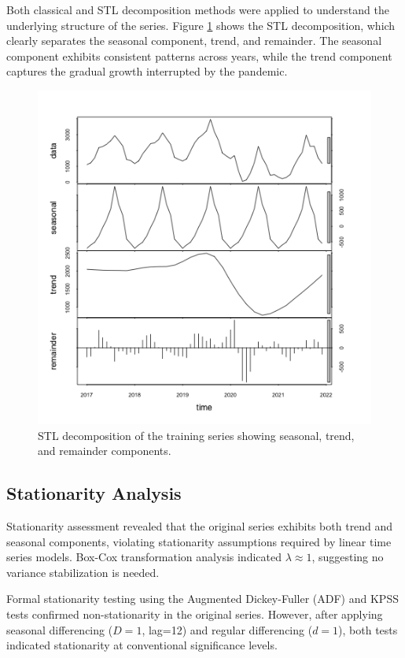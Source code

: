 \documentclass[journal]{IEEEtran}
\begin{document}
Both classical and STL decomposition methods were applied to understand the underlying structure of the series. Figure \ref{fig:decomposition} shows the STL decomposition, which clearly separates the seasonal component, trend, and remainder. The seasonal component exhibits consistent patterns across years, while the trend component captures the gradual growth interrupted by the pandemic.

\begin{figure}[h]
    \centering
    \includegraphics[width=1\linewidth]{plots/decomposition-stl.png}
    \caption{STL decomposition of the training series showing seasonal, trend, and remainder components.}
    \label{fig:decomposition}
\end{figure}

\subsection{Stationarity Analysis}

Stationarity assessment revealed that the original series exhibits both trend and seasonal components, violating stationarity assumptions required by linear time series models. Box-Cox transformation analysis indicated $\lambda \approx 1$, suggesting no variance stabilization is needed.

Formal stationarity testing using the Augmented Dickey-Fuller (ADF) and KPSS tests confirmed non-stationarity in the original series. However, after applying seasonal differencing ($D=1$, lag=12) and regular differencing ($d=1$), both tests indicated stationarity at conventional significance levels.
\end{document}
